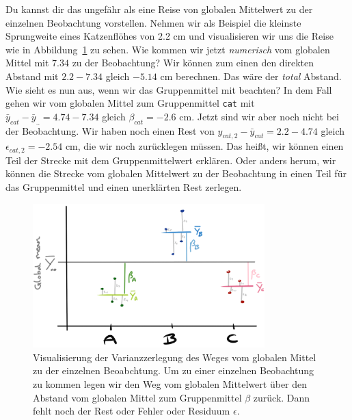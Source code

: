 \documentclass[
  letterpaper,
]{scrbook}
\begin{document}
Du kannst dir das ungefähr als eine Reise von globalen Mittelwert zu der
einzelnen Beobachtung vorstellen. Nehmen wir als Beispiel die kleinste
Sprungweite eines Katzenflöhes von 2.2 cm und visualisieren wir uns die
Reise wie in Abbildung~\ref{fig-single-cat-anova} zu sehen. Wie kommen
wir jetzt \emph{numerisch} vom globalen Mittel mit \(7.34\) zu der
Beobachtung? Wir können zum einen den direkten Abstand mit
\(2.2 - 7.34\) gleich \(-5.14\) cm berechnen. Das wäre der \emph{total}
Abstand. Wie sieht es nun aus, wenn wir das Gruppenmittel mit beachten?
In dem Fall gehen wir vom globalen Mittel zum Gruppenmittel \texttt{cat}
mit \(\bar{y}_{cat} - \bar{y}_{..} = 4.74 -7.34\) gleich
\(\beta_{cat} = -2.6\) cm. Jetzt sind wir aber noch nicht bei der
Beobachtung. Wir haben noch einen Rest von
\(y_{cat,2} - \bar{y}_{cat} = 2.2 - 4.74\) gleich
\(\epsilon_{cat, 2} = -2.54\) cm, die wir noch zurücklegen müssen. Das
heißt, wir können einen Teil der Strecke mit dem Gruppenmittelwert
erklären. Oder anders herum, wir können die Strecke vom globalen
Mittelwert zu der Beobachtung in einen Teil für das Gruppenmittel und
einen unerklärten Rest zerlegen.

\begin{figure}

{\centering \includegraphics[width=0.8\textwidth,height=\textheight]{./images/anova-pre-01.png}

}

\caption{\label{fig-single-cat-anova}Visualisierung der Varianzzerlegung
des Weges vom globalen Mittel zu der einzelnen Beoabchtung. Um zu einer
einzelnen Beobachtung zu kommen legen wir den Weg vom globalen
Mittelwert über den Abstand vom globalen Mittel zum Gruppenmittel
\(\beta\) zurück. Dann fehlt noch der Rest oder Fehler oder Residuum
\(\epsilon\).}

\end{figure}
\end{document}
